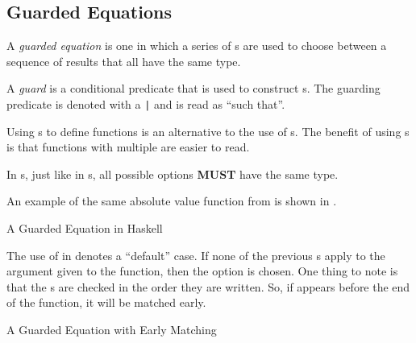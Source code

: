 \subsection{Guarded Equations}\label{subsec:Guarded_Equations}
\begin{definition}\label{def:Guarded_Equation}
  A \emph{guarded equation} is one in which a series of s are used to choose between a sequence of results that all have the same type.
\end{definition}

\begin{definition}[Guard]\label{def:Guard}
  A \emph{guard} is a conditional predicate that is used to construct s.
  The guarding predicate is denoted with a \texttt{|} and is read as ``such that''.
\end{definition}

Using s to define functions is an alternative to the use of s.
The benefit of using s is that functions with multiple  are easier to read.

\begin{blackbox}
  In s, just like in s, all possible options \textbf{MUST} have the same type.
\end{blackbox}

An example of the same absolute value function from  is shown in .
\begin{listing}[h!tbp]
\caption{A Guarded Equation in Haskell}
\label{lst:Guarded_Equation}
\end{listing}

The use of  in  denotes a ``default'' case.
If none of the previous s apply to the argument given to the function, then the  option is chosen.
One thing to note is that the s are checked in the order they are written.
So, if  appears before the end of the function, it will be matched early.
\begin{listing}[h!tbp]
\caption{A Guarded Equation with Early Matching}
\label{lst:Guarded_Equation_Early_Match}
\end{listing}

